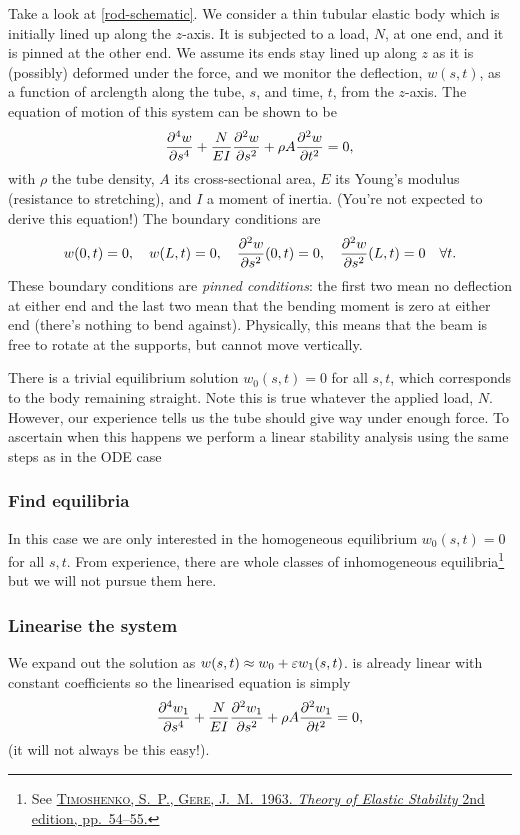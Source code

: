 \documentclass[main.tex]{subfiles}
\begin{document}
Take a look at \cref{rod-schematic}. We consider a thin tubular elastic body which is initially lined up along the $z$-axis. It is subjected to a load, $N$, at one end, and it is pinned at the other end. We assume its ends stay lined up along $z$ as it is (possibly) deformed under the force, and we monitor the deflection, $w(s,t)$, as a function of arclength along the tube, $s$, and time, $t$, from the $z$-axis. The equation of motion of this system can be shown to be 
\begin{align}
\label{beameq}
\pdn{4}{w}{s} + \frac{N}{EI}\pdd{w}{s} +\rho A \pdd{w}{t}=0,
\end{align}
with $\rho$ the tube density, $A$ its cross-sectional area, $E$ its Young's modulus (resistance to stretching), and $I$ a moment of inertia. (You're not expected to derive this equation!) The boundary conditions are 
\begin{equation}
w(0,t) = 0,\quad w(L,t) = 0,\quad \pdd{w}{s}(0,t)= 0,\quad \pdd{w}{s}(L,t)=0 \quad \forall t.
\end{equation}
These boundary conditions are \emph{pinned conditions}: the first two mean no deflection at either end and the last two mean that the bending moment is zero at either end (there's nothing to bend against). Physically, this means that the beam is free to rotate at the supports, but cannot move vertically.

There is a trivial equilibrium solution $w_0(s,t)=0$ for all $s,t$, which corresponds to the body remaining straight. Note this is true whatever the applied load, $N$. However, our experience tells us the tube should give way under enough force. To ascertain when this happens we perform a linear stability analysis using the same steps as in the ODE case

\subsubsection*{\StepOne Find equilibria}
In this case we are only interested in the homogeneous equilibrium $w_0(s,t) = 0$ for all $s,t$. From experience, there are whole classes of inhomogeneous equilibria\footnote{See \href{http://www.kstr.lth.se/fileadmin/kstr/pdf_files/forsk_kurs/Theory_of_elastic_stability_by_S._Timoshenko_and_J.M._Gere__1963_.pdf}{\textsc{Timoshenko}, S.\ P., \textsc{Gere}, J.\ M.\ 1963. \emph{Theory of Elastic Stability} 2nd edition, pp.\ 54--55.}} but we will not pursue them here.

\subsubsection*{\StepTwo Linearise the system}
We expand out the solution as $w(s,t) \approx w_0 + \varepsilon w_1(s,t)$.
 is already linear with constant coefficients so the linearised equation is simply 
\begin{align}
\label{beameqlin}
\pdn{4}{w_1}{s} + \frac{N}{EI}\pdd{w_1}{s} +\rho A \pdd{w_1}{t}=0,
\end{align}
(it will not always be this easy!).
\end{document}
